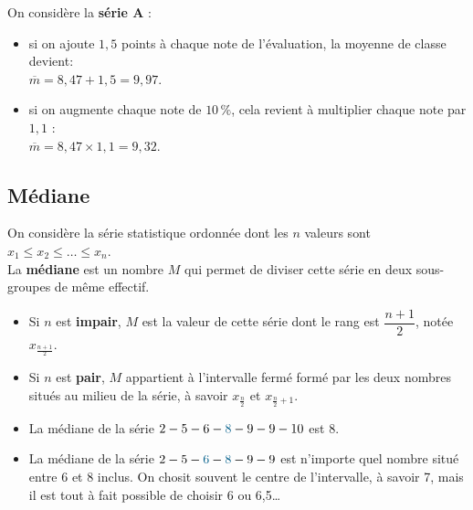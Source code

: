 \smallskip

\begin{exemple*1}
   On considère la \textbf{série A} :
   \begin{itemize}
      \item si on ajoute $1,5$ points à chaque note de l'évaluation, la moyenne de classe devient: \\
         $\overline{m}=8,47+1,5=9,97$. \smallskip
      \item si on augmente chaque note de $10\,\%$, cela revient à multiplier chaque note par $1,1$ : \\
         $\overline{m}=8,47\times1,1=9,32$. \\ [-8mm]
   \end{itemize}
\end{exemple*1}

\subsection{Médiane} %

\begin{definition}[Médiane]
   On considère la série statistique ordonnée dont les $n$ valeurs sont $x_1\leqslant x_2  \leqslant \dots \leqslant x_n$. \\
   La \textbf{médiane} est un nombre $M$ qui permet de diviser cette série en deux sous-groupes de même effectif.
   \begin{itemize}
      \item Si $n$ est \textbf{impair}, $M$ est la valeur de cette série dont le rang est $\dfrac{n+1}{2}$, notée $x_{\frac{n+1}{2}}$.
      \smallskip
      \item Si $n$ est \textbf{pair}, $M$ appartient à l'intervalle fermé formé par les deux nombres situés \og au milieu \fg{} de la série, à savoir $x_{\frac{n}{2}}$ et $x_{\frac{n}{2}+1}$.
   \end{itemize}
\end{definition}

\begin{exemple*1}
   \begin{itemize}
      \item La médiane de la série \og $2-5-6-\textcolor{A1}{8}-9-9-10$ \fg{} est $8$.
      \item La médiane de la série \og $2-5-\textcolor{A1}{6}-\textcolor{A1}{8}-9-9$ \fg{} est n'importe quel nombre situé entre 6 et 8 inclus. On chosit souvent le centre de l'intervalle, à savoir 7, mais il est tout à fait possible de choisir 6 ou 6,5\dots \\ [-8mm]
   \end{itemize}
\end{exemple*1}

